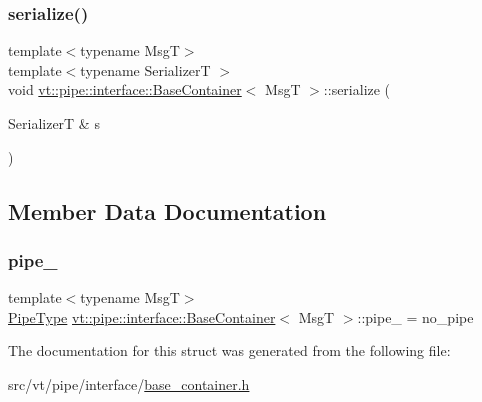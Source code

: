 \mbox{\label{structvt_1_1pipe_1_1interface_1_1_base_container_af042ddd27d8c1d683af861e2d12e0940}} 
\subsubsection{\texorpdfstring{serialize()}{serialize()}}
{\footnotesize\ttfamily template$<$typename MsgT$>$ \\
template$<$typename SerializerT $>$ \\
void \hyperlink{structvt_1_1pipe_1_1interface_1_1_base_container}{vt\+::pipe\+::interface\+::\+Base\+Container}$<$ MsgT $>$\+::serialize (\begin{DoxyParamCaption}\item[{SerializerT \&}]{s }\end{DoxyParamCaption})\hspace{0.3cm}{\ttfamily [inline]}}



\subsection{Member Data Documentation}
\mbox{\label{structvt_1_1pipe_1_1interface_1_1_base_container_a3cada477b55c1201fabef5539825109c}} 
\subsubsection{\texorpdfstring{pipe\+\_\+}{pipe\_}}
{\footnotesize\ttfamily template$<$typename MsgT$>$ \\
\hyperlink{namespacevt_ac9852acda74d1896f48f406cd72c7bd3}{Pipe\+Type} \hyperlink{structvt_1_1pipe_1_1interface_1_1_base_container}{vt\+::pipe\+::interface\+::\+Base\+Container}$<$ MsgT $>$\+::pipe\+\_\+ = no\+\_\+pipe\hspace{0.3cm}{\ttfamily [private]}}



The documentation for this struct was generated from the following file\+:\begin{DoxyCompactItemize}
\item 
src/vt/pipe/interface/\hyperlink{base__container_8h}{base\+\_\+container.\+h}\end{DoxyCompactItemize}

